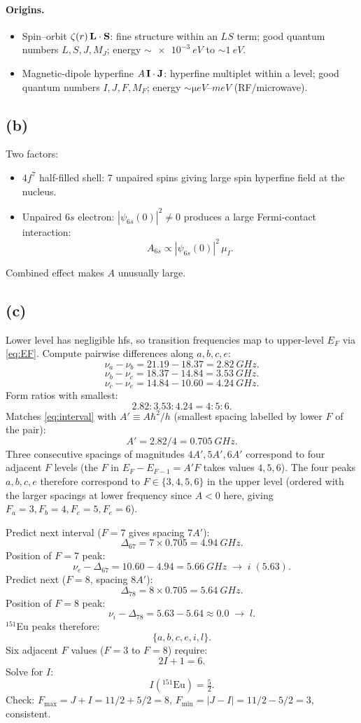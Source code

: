 \documentclass[11pt]{article}
\begin{document}
\paragraph{Origins.}
\begin{itemize}
\item Spin--orbit $\zeta(r)\,\vb L\cdot\vb S$: fine structure within an $LS$ term; good quantum numbers $L,S,J,M_J$; energy $\sim\SI{e-3}{eV}$ to $\sim\SI{1}{eV}$.
\item Magnetic-dipole hyperfine $A\,\vb I\cdot\vb J$: hyperfine multiplet within a level; good quantum numbers $I,J,F,M_F$; energy $\sim\si{\micro eV}$--$\si{meV}$ (RF/microwave).
\end{itemize}

\subsection*{(b)}

Two factors:
\begin{itemize}
\item $4f^7$ half-filled shell: 7 unpaired spins giving large spin hyperfine field at the nucleus.
\item Unpaired $6s$ electron: $|\psi_{6s}(0)|^2\ne 0$ produces a large Fermi-contact interaction:
\[ A_{6s}\propto |\psi_{6s}(0)|^2\,\mu_I. \]
\end{itemize}
Combined effect makes $A$ unusually large.

\subsection*{(c)}

Lower level has negligible hfs, so transition frequencies map to upper-level $E_F$ via \eqref{eq:EF}. Compute pairwise differences along $a,b,c,e$:
\[ \nu_a-\nu_b=21.19-18.37=\SI{2.82}{GHz}. \]
\[ \nu_b-\nu_c=18.37-14.84=\SI{3.53}{GHz}. \]
\[ \nu_c-\nu_e=14.84-10.60=\SI{4.24}{GHz}. \]
Form ratios with smallest:
\[ 2.82:3.53:4.24=4:5:6. \]
Matches \eqref{eq:interval} with $A'\equiv A\hbar^2/h$ (smallest spacing labelled by lower $F$ of the pair):
\[ A'=2.82/4=\SI{0.705}{GHz}. \]
Three consecutive spacings of magnitudes $4A',5A',6A'$ correspond to four adjacent $F$ levels (the $F$ in $E_F-E_{F-1}=A'F$ takes values $4,5,6$). The four peaks $a,b,c,e$ therefore correspond to $F\in\{3,4,5,6\}$ in the upper level (ordered with the larger spacings at lower frequency since $A<0$ here, giving $F_a=3,F_b=4,F_c=5,F_e=6$).

Predict next interval ($F=7$ gives spacing $7A'$):
\[ \Delta_{67}=7\times 0.705=\SI{4.94}{GHz}. \]
Position of $F=7$ peak:
\[ \nu_e-\Delta_{67}=10.60-4.94=\SI{5.66}{GHz}\;\rightarrow\;i\;(5.63). \]
Predict next ($F=8$, spacing $8A'$):
\[ \Delta_{78}=8\times 0.705=\SI{5.64}{GHz}. \]
Position of $F=8$ peak:
\[ \nu_i-\Delta_{78}=5.63-5.64\approx 0.0\;\rightarrow\;l. \]
${}^{151}$Eu peaks therefore:
\[ \boxed{\;\{a,b,c,e,i,l\}.\;} \]
Six adjacent $F$ values ($F=3$ to $F=8$) require:
\[ 2I+1=6. \]
Solve for $I$:
\[ \boxed{\;I({}^{151}\text{Eu})=\tfrac{5}{2}.\;} \]
Check: $F_\text{max}=J+I=11/2+5/2=8$, $F_\text{min}=|J-I|=11/2-5/2=3$, consistent.
\end{document}
